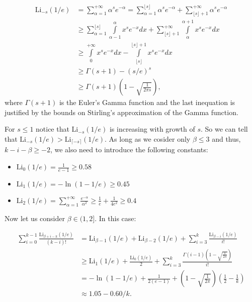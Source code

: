 \documentclass{article}
\begin{document}
\begin{align*}
  \text{Li}_{-s}(1/e) &= \sum\limits_{\alpha = 1}^{+ \infty} \alpha^s e^{-\alpha} = \sum\limits_{\alpha = 1}^{\lfloor s \rfloor} \alpha^s e^{-\alpha} + \sum\limits_{\lfloor s \rfloor + 1}^{+\infty} \alpha^s e^{-\alpha} \\
  &\ge \sum\limits_{\alpha = 1}^{\lfloor s \rfloor} \int\limits_{\alpha - 1}^\alpha x^s e^{-x} dx + \sum\limits_{\lfloor s \rfloor + 1}^{+\infty} \int\limits_\alpha^{\alpha + 1} x^s e^{-x} dx \\
  &\ge \int\limits_0^{+\infty} x^s e^{-x} dx - \int\limits_{\lfloor s \rfloor}^{\lfloor s \rfloor + 1} x^s e^{-x} dx \\
  &\ge \Gamma(s + 1) - (s / e)^s \\
  &\ge \Gamma(s + 1) \left(1 - \sqrt{\frac{1}{2 \pi s}}\right),
\end{align*}
where $\Gamma(s + 1)$ is the Euler's Gamma function and the last inequation is justified by the bounds on Stirling's approximation of the Gamma function.

For $s \le 1$ notice that $\text{Li}_{-s}(1/e)$ is increasing with growth of $s$. So we can tell that $\text{Li}_{-s}(1/e) > \text{Li}_{\lceil-s\rceil}(1/e)$. As long as we cosider only $\beta \le 3$ and thus, $k - i - \beta \ge -2$, we also need to introduce the following constants:

\begin{itemize}
  \item $\text{Li}_0(1/e) = \frac{1}{e - 1} \ge 0.58$
  \item $\text{Li}_1(1/e) = -\ln(1 - 1/e) \ge 0.45$
  \item $\text{Li}_2(1/e) = \sum\limits_{\alpha = 1}^{+\infty} \frac{e^{-\alpha}}{\alpha^2} \ge \frac{1}{e} + \frac{1}{4e^2} \ge 0.4$
\end{itemize}


Now let us consider $\beta \in (1, 2].$ In this case:

\begin{align*}
  \sum\limits_{i = 0}^{k - 1} \frac{\text{Li}_{\beta + i - k}(1/e)}{(k - i)!} &= \text{Li}_{\beta - 1}(1/e) + \text{Li}_{\beta - 2}(1/e) + \sum\limits_{i = 3}^{k} \frac{\text{Li}_{\beta - i}(1/e)}{i!} \\
  & \ge \text{Li}_1(1/e) + \frac{\text{Li}_0(1/e)}{2} + \sum\limits_{i = 3}^{k} \frac{\Gamma(i - 1)\left(1 - \sqrt{\frac{1}{2\pi}}\right)}{i!} \\
  &= -\ln(1 - 1/e) + \frac{1}{2(e - 1)} + \left(1 - \sqrt{\frac{1}{2\pi}}\right) \left(\frac{1}{2} - \frac{1}{k}\right) \\
  &\approx 1.05 - 0.60 / k.
\end{align*}
\end{document}
